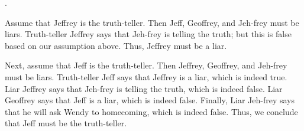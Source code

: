 \documentclass{article}
\begin{document}
\begin{answer}
.
\end{answer}

\begin{solution}
Assume that Jeffrey is the truth-teller. Then Jeff, Geoffrey, and Jeh-frey must be liars. Truth-teller Jeffrey says that Jeh-frey is telling the truth; but this is false based on our assumption above. Thus, Jeffrey must be a liar.

Next, assume that Jeff is the truth-teller. Then Jeffrey, Geoffrey, and Jeh-frey must be liars. Truth-teller Jeff says that Jeffrey is a liar, which is indeed true. Liar Jeffrey says that Jeh-frey is telling the truth, which is indeed false. Liar Geoffrey says that Jeff is a liar, which is indeed false. Finally, Liar Jeh-frey says that he will ask Wendy to homecoming, which is indeed false. Thus, we conclude that Jeff must be the truth-teller.
\end{solution}
\end{document}
